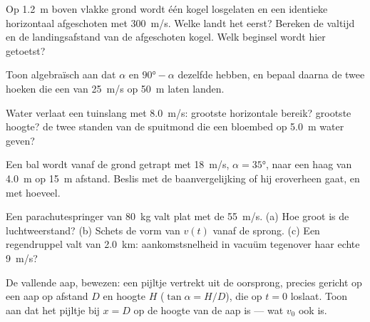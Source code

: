 \begin{exercise}[$\star\star$]\label{exo:g12:projectile-motion:10}
Op \qty{1.2}{m} boven vlakke grond wordt één kogel losgelaten en een
identieke horizontaal afgeschoten met \qty{300}{m/s}. Welke landt het eerst?
Bereken de valtijd en de landingsafstand van de afgeschoten kogel. Welk
beginsel wordt hier getoetst?
\end{exercise}

\begin{exercise}[$\star\star$]\label{exo:g12:projectile-motion:11}
Toon algebraïsch aan dat $\alpha$ en $\ang{90} - \alpha$ dezelfde 
hebben, en bepaal daarna de twee hoeken die een  van \qty{25}{m/s}
op \qty{50}{m} laten landen.
\end{exercise}

\begin{exercise}[$\star\star\star$]\label{exo:g12:projectile-motion:12}
Water verlaat een tuinslang met \qty{8.0}{m/s}: grootste horizontale bereik?
grootste hoogte? de twee standen van de spuitmond die een bloembed op
\qty{5.0}{m} water geven?
\end{exercise}

\begin{exercise}[$\star\star\star$]\label{exo:g12:projectile-motion:13}
Een bal wordt vanaf de grond getrapt met \qty{18}{m/s}, $\alpha = \ang{35}$,
naar een haag van \qty{4.0}{m} op \qty{15}{m} afstand. Beslis met de
baanvergelijking of hij eroverheen gaat, en met hoeveel.
\end{exercise}

\begin{exercise}[$\star\star\star$]\label{exo:g12:projectile-motion:14}
Een parachutespringer van \qty{80}{kg} valt plat met de 
\qty{55}{m/s}. (a) Hoe groot is de luchtweerstand? (b) Schets de vorm van
$v(t)$ vanaf de sprong. (c) Een regendruppel valt van \qty{2.0}{km}:
aankomstsnelheid in vacuüm tegenover haar echte \qty{9}{m/s}?
\end{exercise}

\begin{exercise}[$\star\star\star$]\label{exo:g12:projectile-motion:15}
De vallende aap, bewezen: een pijltje vertrekt uit de oorsprong, precies
gericht op een aap op afstand $D$ en hoogte $H$ ($\tan\alpha = H/D$), die op
$t = 0$ loslaat. Toon aan dat het pijltje bij $x = D$ op de hoogte van de aap
is --- wat $v_0$ ook is.
\end{exercise}

